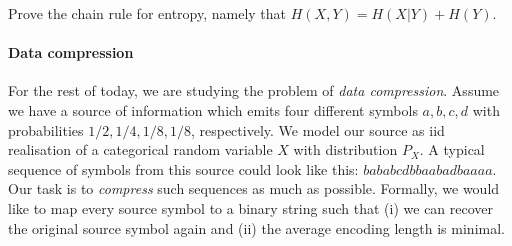 \documentclass[10pt, a5paper]{scrartcl}
\begin{document}
\boardquestions


\begin{exercise}
  Prove the chain rule for entropy, namely that $H(X,Y)=H(X|Y)+H(Y)$.	
\end{exercise}


\paragraph{Data compression}
For the rest of today, we are studying the problem of \emph{data compression}. 
Assume we have a source of information which emits four different symbols
$a,b,c,d$ with probabilities $1/2,1/4,1/8,1/8$, respectively. We model our
source as iid realisation of a categorical random variable $X$ with
distribution $P_X$. A typical sequence of symbols from this source could look
like this: $bababcdbbaabadbaaaa$. Our task is to \emph{compress} such sequences
as much as possible.  Formally, we would like to map every source symbol to a
binary string such that (i) we can recover the original source symbol again and
(ii) the average encoding length is minimal.

\end{document}
